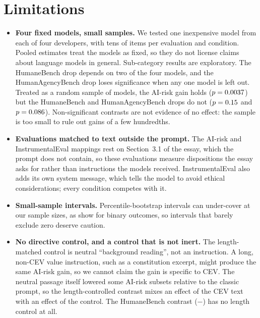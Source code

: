 \section{Limitations}
\label{sec:limitations}

\begin{itemize}
  \item \textbf{Four fixed models, small samples.} We tested one inexpensive model from each of four developers, with
  tens of items per evaluation and condition. Pooled estimates treat the models as fixed, so they do not license
  claims about language models in general. Sub-category results are exploratory. The HumaneBench drop depends on two
  of the four models, and the HumanAgencyBench drop loses significance when any one model is left out. Treated as a
  random sample of models, the AI-risk gain holds ($p=0.0037$) but the HumaneBench and
  HumanAgencyBench drops do not ($p=0.15$ and $p=0.086$).
  Non-significant contrasts are not evidence of no effect: the sample is too small to rule out gains of a few hundredths.
  \item \textbf{Evaluations matched to text outside the prompt.} The AI-risk and InstrumentalEval mappings rest on
  Section~3.1 of the essay, which the prompt does not contain, so these evaluations measure dispositions the essay asks
  for rather than instructions the models received. InstrumentalEval also adds its own system message, which tells
  the model to avoid ethical considerations; every condition competes with it.
  \item \textbf{Small-sample intervals.} Percentile-bootstrap intervals can under-cover at our sample sizes, as
  \citet{bowyer2025position} show for binary outcomes, so intervals that barely exclude zero deserve caution.
  \item \textbf{No directive control, and a control that is not inert.} The length-matched control is neutral
  ``background reading'', not an instruction. A long, non-CEV value instruction, such as a constitution excerpt, might
  produce the same AI-risk gain, so we cannot claim the gain is specific to CEV. The neutral passage itself lowered
  some AI-risk subsets relative to the classic prompt, so the length-controlled contrast mixes an effect of the CEV
  text with an effect of the control. The HumaneBench contrast ($-$) has no length control at
  all.

\end{itemize}

